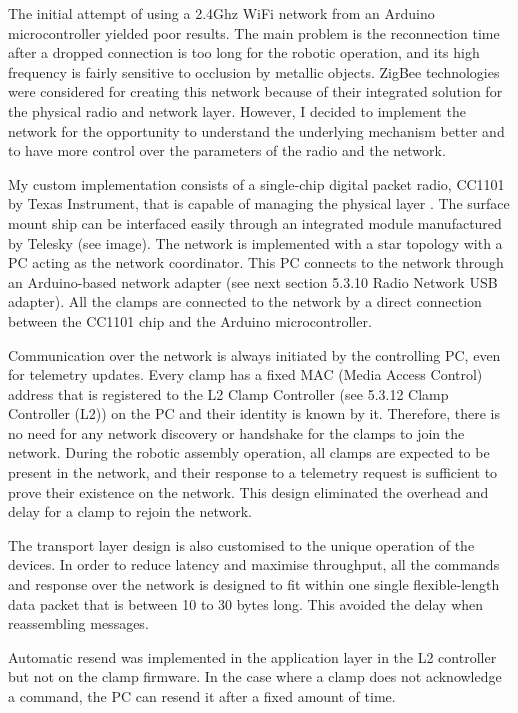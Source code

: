 The initial attempt of using a 2.4Ghz WiFi network from an Arduino microcontroller yielded poor results. The main problem is the reconnection time after a dropped connection is too long for the robotic operation, and its high frequency is fairly sensitive to occlusion by metallic objects. ZigBee technologies were considered for creating this network because of their integrated solution for the physical radio and network layer. However, I decided to implement the network for the opportunity to understand the underlying mechanism better and to have more control over the parameters of the radio and the network.


My custom implementation consists of a single-chip digital packet radio, CC1101 by Texas Instrument, that is capable of managing the physical layer \parencite{texasinstrumentsCC1101LowPowerSub12023}. The surface mount ship can be interfaced easily through an integrated module manufactured by Telesky (see image). The network is implemented with a star topology with a PC acting as the network coordinator. This PC connects to the network through an Arduino-based network adapter (see next section 5.3.10 Radio Network USB adapter). All the clamps are connected to the network by a direct connection between the CC1101 chip and the Arduino microcontroller. 

Communication over the network is always initiated by the controlling PC, even for telemetry updates. Every clamp has a fixed MAC (Media Access Control) address that is registered to the L2 Clamp Controller (see 5.3.12 Clamp Controller (L2)) on the PC and their identity is known by it. Therefore, there is no need for any network discovery or handshake for the clamps to join the network. During the robotic assembly operation, all clamps are expected to be present in the network, and their response to a telemetry request is sufficient to prove their existence on the network. This design eliminated the overhead and delay for a clamp to rejoin the network.

The transport layer design is also customised to the unique operation of the devices. In order to reduce latency and maximise throughput, all the commands and response over the network is designed to fit within one single flexible-length data packet that is between 10 to 30 bytes long. This avoided the delay when reassembling messages. 

Automatic resend was implemented in the application layer in the L2 controller but not on the clamp firmware. In the case where a clamp does not acknowledge a command, the PC can resend it after a fixed amount of time. 

